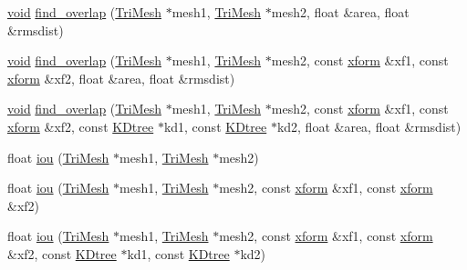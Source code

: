 \begin{DoxyCompactItemize}
\item 
\hyperlink{namespacetrimesh_a784ddfd979e1c579bda795a8edfc3f43}{void} \hyperlink{namespacetrimesh_afd23e86e789949b55df12657a3c4e5e9}{find\+\_\+overlap} (\hyperlink{classtrimesh_1_1TriMesh}{Tri\+Mesh} $\ast$mesh1, \hyperlink{classtrimesh_1_1TriMesh}{Tri\+Mesh} $\ast$mesh2, float \&area, float \&rmsdist)
\item 
\hyperlink{namespacetrimesh_a784ddfd979e1c579bda795a8edfc3f43}{void} \hyperlink{namespacetrimesh_a317544eacae9d2ab40961b745321a82f}{find\+\_\+overlap} (\hyperlink{classtrimesh_1_1TriMesh}{Tri\+Mesh} $\ast$mesh1, \hyperlink{classtrimesh_1_1TriMesh}{Tri\+Mesh} $\ast$mesh2, const \hyperlink{namespacetrimesh_ad504958f2f56e393991b848986a8459f}{xform} \&xf1, const \hyperlink{namespacetrimesh_ad504958f2f56e393991b848986a8459f}{xform} \&xf2, float \&area, float \&rmsdist)
\item 
\hyperlink{namespacetrimesh_a784ddfd979e1c579bda795a8edfc3f43}{void} \hyperlink{namespacetrimesh_a3cba50c5fc7eb4957838dfbf00e131e1}{find\+\_\+overlap} (\hyperlink{classtrimesh_1_1TriMesh}{Tri\+Mesh} $\ast$mesh1, \hyperlink{classtrimesh_1_1TriMesh}{Tri\+Mesh} $\ast$mesh2, const \hyperlink{namespacetrimesh_ad504958f2f56e393991b848986a8459f}{xform} \&xf1, const \hyperlink{namespacetrimesh_ad504958f2f56e393991b848986a8459f}{xform} \&xf2, const \hyperlink{classtrimesh_1_1KDtree}{K\+Dtree} $\ast$kd1, const \hyperlink{classtrimesh_1_1KDtree}{K\+Dtree} $\ast$kd2, float \&area, float \&rmsdist)
\item 
float \hyperlink{namespacetrimesh_a5af812fcd442454f05a172c4b3b132b2}{iou} (\hyperlink{classtrimesh_1_1TriMesh}{Tri\+Mesh} $\ast$mesh1, \hyperlink{classtrimesh_1_1TriMesh}{Tri\+Mesh} $\ast$mesh2)
\item 
float \hyperlink{namespacetrimesh_ade49644c26711ac5636cdadeaf9cd6cb}{iou} (\hyperlink{classtrimesh_1_1TriMesh}{Tri\+Mesh} $\ast$mesh1, \hyperlink{classtrimesh_1_1TriMesh}{Tri\+Mesh} $\ast$mesh2, const \hyperlink{namespacetrimesh_ad504958f2f56e393991b848986a8459f}{xform} \&xf1, const \hyperlink{namespacetrimesh_ad504958f2f56e393991b848986a8459f}{xform} \&xf2)
\item 
float \hyperlink{namespacetrimesh_a0cc5429c6b69538825fc7e9975cccc03}{iou} (\hyperlink{classtrimesh_1_1TriMesh}{Tri\+Mesh} $\ast$mesh1, \hyperlink{classtrimesh_1_1TriMesh}{Tri\+Mesh} $\ast$mesh2, const \hyperlink{namespacetrimesh_ad504958f2f56e393991b848986a8459f}{xform} \&xf1, const \hyperlink{namespacetrimesh_ad504958f2f56e393991b848986a8459f}{xform} \&xf2, const \hyperlink{classtrimesh_1_1KDtree}{K\+Dtree} $\ast$kd1, const \hyperlink{classtrimesh_1_1KDtree}{K\+Dtree} $\ast$kd2)

\end{DoxyCompactItemize}
